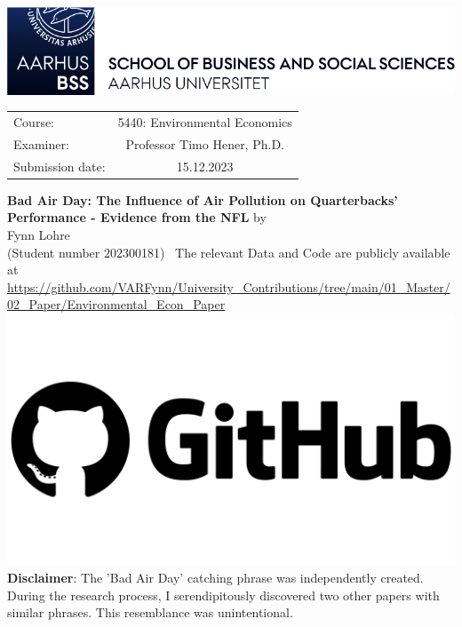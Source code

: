 \documentclass[12pt,a4paper]{article}
\author{\myname}
\title{\mytitle}
\newcommand{\myname}{Fynn Lohre}
\newcommand{\mytitle}{Bad Air Day: The Influence of Air Pollution on Quarterbacks' Performance - Evidence from the NFL}
\newcommand{\myexaminer}{Professor Timo Hener, Ph.D. }
\newcommand{\mycourse}{5440: Environmental Economics}
\newcommand{\mysubmission}{15.12.2023}
\newcommand{\mymatr}{202300181}
\begin{document}
\begin{titlepage}
\center
\vfill
\includegraphics[scale=0.90]{BSS.png}
\vfill
\begin{tabular}[t]{lc}
Course: & \mycourse \\
Examiner: & \myexaminer \\
Submission date: & \mysubmission \\
\end{tabular}
\vfill
{\large \textbf{\mytitle}}
\vfill
by \\ \vspace{3mm}
{\Large \myname}\\
(Student number \mymatr)\
\vfill
The relevant Data and Code are publicly available at \url{https://github.com/VARFynn/University_Contributions/tree/main/01_Master/02_Paper/Environmental_Econ_Paper}\\ 
\href{https://github.com/VARFynn/University_Contributions/tree/main/01_Master/02_Paper/Environmental_Econ_Paper}{\includegraphics[scale=0.015]{GitHub.png}}
\vfill 
\scriptsize \textbf{Disclaimer}: The 'Bad Air Day' catching phrase was independently created. During the research process, I serendipitously discovered two other papers with similar phrases. This resemblance was unintentional.
\vfill
\thispagestyle{empty}
\pagebreak
\end{titlepage}
\end{document}
